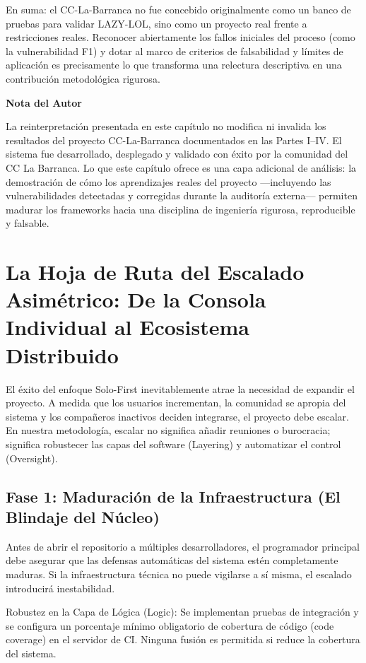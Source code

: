\documentclass[14pt,a4paper,oneside]{extbook}
\begin{document}
En suma: el CC-La-Barranca no fue concebido originalmente como un banco de pruebas para validar LAZY-LOL, sino como un proyecto real frente a restricciones reales. Reconocer abiertamente los fallos iniciales del proceso (como la vulnerabilidad F1) y dotar al marco de criterios de falsabilidad y límites de aplicación es precisamente lo que transforma una relectura descriptiva en una contribución metodológica rigurosa.

\bigskip
\noindent\textbf{Nota del Autor}

La reinterpretación presentada en este capítulo no modifica ni invalida los resultados del proyecto CC-La-Barranca documentados en las Partes I--IV. El sistema fue desarrollado, desplegado y validado con éxito por la comunidad del CC La Barranca. Lo que este capítulo ofrece es una capa adicional de análisis: la demostración de cómo los aprendizajes reales del proyecto ---incluyendo las vulnerabilidades detectadas y corregidas durante la auditoría externa--- permiten madurar los frameworks hacia una disciplina de ingeniería rigurosa, reproducible y falsable.




\chapter{La Hoja de Ruta del Escalado Asimétrico: De la Consola Individual al Ecosistema Distribuido}

El éxito del enfoque Solo-First inevitablemente atrae la necesidad de expandir el proyecto. A medida que los usuarios incrementan, la comunidad se apropia del sistema y los compañeros inactivos deciden integrarse, el proyecto debe escalar. En nuestra metodología, escalar no significa añadir reuniones o burocracia; significa robustecer las capas del software (Layering) y automatizar el control (Oversight).

\section{Fase 1: Maduración de la Infraestructura (El Blindaje del Núcleo)}

Antes de abrir el repositorio a múltiples desarrolladores, el programador principal debe asegurar que las defensas automáticas del sistema estén completamente maduras. Si la infraestructura técnica no puede vigilarse a sí misma, el escalado introducirá inestabilidad.

Robustez en la Capa de Lógica (Logic): Se implementan pruebas de integración y se configura un porcentaje mínimo obligatorio de cobertura de código (code coverage) en el servidor de CI. Ninguna fusión es permitida si reduce la cobertura del sistema.
\end{document}
